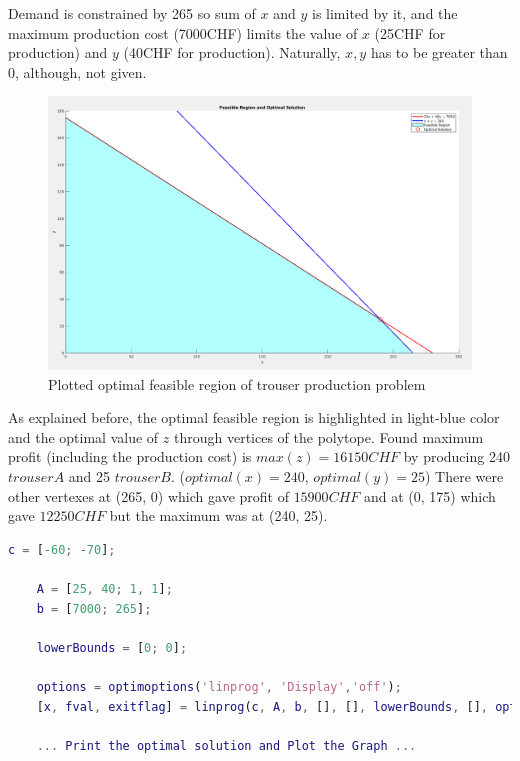 \documentclass[unicode,11pt,a4paper,oneside,numbers=endperiod,openany]{scrartcl}
\begin{document}
Demand is constrained by 265 so sum of ${x}$ and ${y}$ is limited by it, and the maximum production cost (7000CHF) limits the value of ${x}$ (25CHF for production) and ${y}$ (40CHF for production). Naturally, ${x, y}$ has to be greater than 0, although, not given. \\

\begin{figure}[h!]
    \begin{minipage}[c]{1\linewidth}
        \centering
        \includegraphics[width=0.9\linewidth]{./figure2.png}
    \end{minipage}
    \caption{Plotted optimal feasible region of trouser production problem}
\end{figure}

As explained before, the optimal feasible region is highlighted in light-blue color and the optimal value of ${z}$ through vertices of the polytope. Found maximum profit (including the production cost) is ${max(z) = 16150 CHF}$ by producing 240 ${trouserA}$ and 25 ${trouserB}$. (${optimal(x)=240}$, ${optimal(y)=25}$) There were other vertexes at (265, 0) which gave profit of ${15900CHF}$ and at (0, 175) which gave ${12250CHF}$ but the maximum was at (240, 25). \\

\begin{lstlisting}[language=Matlab]
    c = [-60; -70];

    A = [25, 40; 1, 1];
    b = [7000; 265];

    lowerBounds = [0; 0];

    options = optimoptions('linprog', 'Display','off');
    [x, fval, exitflag] = linprog(c, A, b, [], [], lowerBounds, [], options);
    
    ... Print the optimal solution and Plot the Graph ...
\end{lstlisting}
\end{document}
